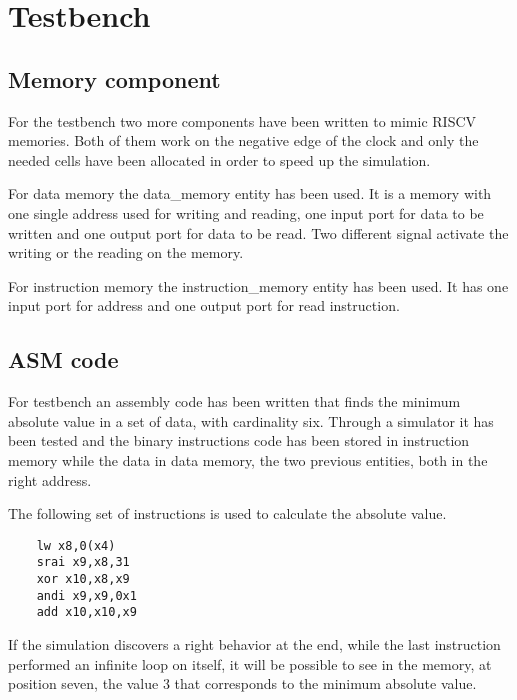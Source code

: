 %
\chapter{Testbench}
\label{cha5}

\section{Memory component}

For the testbench two more components have been written to mimic RISCV memories. Both of them
work on the negative edge of the clock and only the needed cells have been allocated in order 
to speed up the simulation.

For data memory the data\_memory entity has been used. It is a memory with one single address used
for writing and reading, one input port for data to be written and one output port 
for data to be read. Two different signal activate the writing or the reading on the memory.

For instruction memory the instruction\_memory entity has been used. It has one input port
for address and one output port for read instruction.

\section{ASM code}

For testbench an assembly code has been written that finds the minimum absolute value in a 
set of data, with cardinality six. Through a simulator it has been tested and the binary instructions code has been 
stored in instruction memory while the data in data memory, the two previous entities, both in the right address.

The following set of instructions is used to calculate the absolute value.
\begin{lstlisting}
    lw x8,0(x4)       
    srai x9,x8,31     
    xor x10,x8,x9     
    andi x9,x9,0x1    
    add x10,x10,x9   
\end{lstlisting}

If the simulation discovers a right behavior at the end, while the last instruction performed an infinite loop 
on itself, it will be possible to see in the memory, at position seven, the value 3 that corresponds to the minimum 
absolute value.

